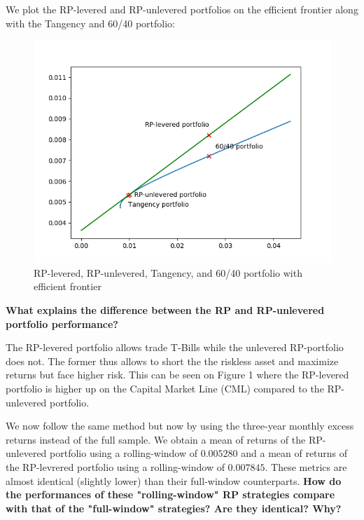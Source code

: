 \documentclass[10pt]{article}
\newenvironment{exercise}[2][Exercise]{\begin{trivlist}
  \item[\hskip \labelsep {\bfseries #1}\hskip \labelsep {\bfseries #2.}]}{\end{trivlist}}
\begin{document}
\begin{exercise}{3}
	We plot the RP-levered and RP-unlevered portfolios on the efficient frontier along with the Tangency and 60/40 portfolio:
	
	\begin{figure}[H]
	
		\centering
		\includegraphics[scale=0.8]{figures/ex3.png}	
		\caption{RP-levered, RP-unlevered, Tangency, and 60/40 portfolio with efficient frontier}	
		\label{fig:ex3}
	
	\end{figure} 
	
	\textbf{What explains the difference between the RP and RP-unlevered portfolio performance?}
	
	\smallbreak
	
	The RP-levered portfolio allows trade T-Bills while the unlevered RP-portfolio does not. The former thus allows to short the the riskless asset and maximize returns but face higher risk. This can be seen on Figure 1 where the RP-levered portfolio is higher up on the Capital Market Line (CML) compared to the RP-unlevered portfolio.
	
	\bigbreak	
	
	We now follow the same method but now by using the three-year monthly excess returns instead of the full sample. We obtain a mean of returns of the RP-unlevered portfolio using a rolling-window of $0.005280$ and a mean of returns of the RP-levrered portfolio using a rolling-window of $0.007845$. These metrics are almost identical (slightly lower) than their full-window counterparts. \textbf{How do the performances of these "rolling-window" RP strategies compare with that of the "full-window" strategies? Are they identical? Why?} 
	

\end{exercise}
\end{document}
